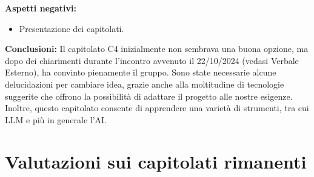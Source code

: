 \documentclass[10pt]{article}
\begin{document}
\textbf{Aspetti negativi:}
\begin{itemize}
    \item Presentazione dei capitolati.
\end{itemize}
\textbf{Conclusioni:}  
Il capitolato C4 inizialmente non sembrava una buona opzione, ma dopo dei chiarimenti durante l’incontro avvenuto il 22/10/2024 (vedasi Verbale Esterno), ha convinto pienamente il gruppo. Sono state necessarie alcune delucidazioni per cambiare idea, grazie anche alla moltitudine di tecnologie suggerite che offrono la possibilità di adattare il progetto alle nostre esigenze. Inoltre, questo capitolato consente di apprendere una varietà di strumenti, tra cui LLM e più in generale l’AI.

\section{Valutazioni sui capitolati rimanenti}
\end{document}
